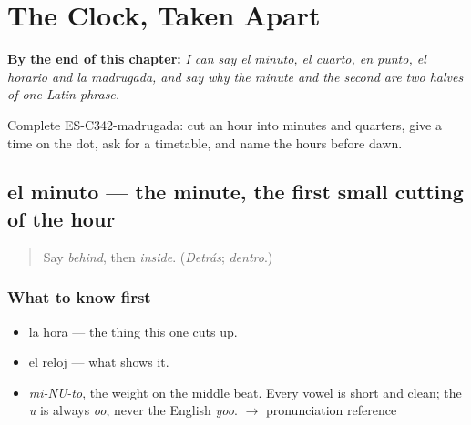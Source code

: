 
\chapter{The Clock, Taken Apart}
\label{ch:el-minuto-y-el-cuarto}

\begin{chapteropening}
\textbf{By the end of this chapter:} \emph{I can say el minuto, el cuarto, en punto, el horario and la madrugada, and say why the minute and the second are two halves of one Latin phrase.}

Complete ES-C342-madrugada: cut an hour into minutes and quarters, give a time on the dot, ask for a timetable, and name the hours before dawn.
\end{chapteropening}

\section[el minuto]{el minuto — the minute, the first small cutting of the hour}

\label{lesson:ES-C342-minuto}



\begin{quote}
Say \emph{behind}, then \emph{inside}. (\emph{Detrás}; \emph{dentro}.)
\end{quote}

\subsection*{What to know first}
\begin{itemize}
\raggedright
  \item la hora — the thing this one cuts up.
  \item el reloj — what shows it.
\end{itemize}

\begin{sounds}
\begin{itemize}
\raggedright
  \item \emph{mi-NU-to}, the weight on the middle beat. Every vowel is short and clean; the \emph{u} is always \emph{oo}, never the English \emph{yoo}. $\to$ pronunciation reference
\end{itemize}
\end{sounds}

